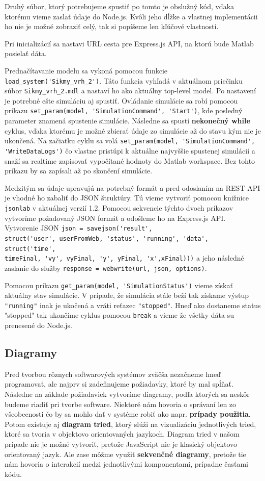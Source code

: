 Druhý súbor, ktorý potrebujeme spustiť po tomto je obslužný kód, vďaka ktorému vieme zaslať údaje do Node.js. Kvôli jeho dĺžke a vlastnej implementácii ho nie je možné zobraziť celý, tak si popíšeme len kľúčové vlastnosti.

Pri inicializácií sa nastavi URL cesta pre Express.js API, na ktorú bude Matlab posielať dáta.

Prednačítavanie modelu sa vykoná pomocou funkcie \verb|load_system('Sikmy_vrh_2')|. Táto funkcia vyhľadá v aktuálnom priečinku súbor \verb|Sikmy_vrh_2.mdl| a nastaví ho ako aktuálny top-level model. Po nastavení je potrebné ešte simuláciu aj spustiť. Ovládanie simulácie sa robí pomocou príkazu \verb|set_param(model, 'SimulationCommand', 'Start')|, kde posledný parameter znamená spustenie simulácie.
Následne sa spustí \textbf{nekonečný while} cyklus, vďaka ktorému je možné zbierať údaje zo simulácie až do stavu kým nie je ukončená. 
Na začiatku cyklu sa volá \verb|set_param(model, 'SimulationCommand',| \\ \verb|'WriteDataLogs')| čo vlastne pristúpi k aktuálne najvyššie spustenej simulácií a snaží sa realtime zapisovať vypočítané hodnoty do Matlab workspace. Bez tohto príkazu by sa zapísali až po skončení simulácie.

Medzitým sa údaje upravujú na potrebný formát a pred odoslaním na REST API je vhodné ho zabaliť do JSON štruktúry. Tú vieme vytvoriť pomocou knižnice \verb|jsonlab| v aktuálnej verzií 1.2.
Pomocou sekvencie týchto dvoch príkazov vytvoríme požadovaný JSON formát a odošleme ho na Express.js API. Vytvorenie JSON \verb|json = savejson('result',| \\ \verb|struct('user', userFromWeb, 'status', 'running', 'data', struct('time',| \\ \verb|timeFinal, 'vy', vyFinal, 'y', yFinal, 'x',xFinal)))| a jeho následné zaslanie do služby \verb|response = webwrite(url, json, options)|.

Pomocou príkazu \verb|get_param(model, 'SimulationStatus')| vieme získať aktuálny stav simulácie. V prípade, že simulácia stále beží tak získame výstup \verb|"running"| inak je ukočená a vráti reťazec \verb|"stopped"|. Hneď ako dostaneme status "stopped" tak ukončíme cyklus pomocou \verb|break| a vieme že všetky dáta su prenesené do Node.js.

\subsection{Diagramy}
Pred tvorbou rôznych softwarových systémov zväčša nezačneme hneď programovať, ale najprv si zadefinujeme požiadavky, ktoré by mal spĺňať. Následne na základe požiadaviek vytvoríme diagramy, podľa ktorých sa neskôr budeme riadiť pri tvorbe software. Niektoré nám hovoria o správaní len zo všeobecnosti čo by sa mohlo dať v systéme robiť ako napr. \textbf{prípady použitia}. Potom existuje aj \textbf{diagram tried}, ktorý slúži na vizualizáciu jednotlivých tried, ktoré sa tvoria v objektovo orientovaných jazykoch. Diagram tried v našom prípade nie je možné vytvoriť, pretože JavaScript nie je klasický objektovo orientovaný jazyk. Ale zase môžme využiť \textbf{sekvenčné diagramy}, pretože tie nám hovoria o interakcií medzi jednotlivými komponentami, prípadne časťami kódu.

